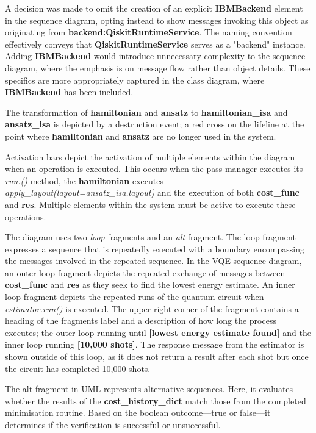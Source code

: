 \documentclass{article}
\begin{document}
{A decision was made to omit the creation of an explicit \textbf{IBMBackend} element in the sequence diagram, opting instead to show messages invoking this object as originating from \textbf{backend:QiskitRuntimeService}.
The naming convention effectively conveys that \textbf{QiskitRuntimeService} serves as a "backend" instance. Adding \textbf{IBMBackend} would introduce unnecessary complexity to the sequence diagram, where the emphasis is on message flow rather than object details. These specifics are more appropriately captured in the class diagram, where \textbf{IBMBackend} has been included.

The transformation of \textbf{hamiltonian} and \textbf{ansatz} to \textbf{hamiltonian\_isa} and \textbf{ansatz\_isa} is depicted by a destruction event; a red cross on the lifeline at the point where \textbf{hamiltonian} and \textbf{ansatz} are no longer used in the system.

Activation bars depict the activation of multiple elements within the diagram when an operation is executed\cite{creatley}. This occurs when the pass manager executes its \textit{run.()} method, the  \textbf{hamiltonian} executes \textit{apply\_layout(layout=ansatz\_isa.layout)} and the execution of both \textbf{cost\_func} and \textbf{res}. Multiple elements within the system must be active to execute these operations.

The diagram uses two \textit{loop} fragments and an \textit{alt} fragment. The loop fragment expresses a sequence that is repeatedly executed\cite{Seidl_Scholz_Huemer_Kappel_Duffy_2014} with a boundary encompassing the messages involved in the repeated sequence. In the VQE sequence diagram, an outer loop fragment depicts the repeated exchange of messages between \textbf{cost\_func} and \textbf{res} as they seek to find the lowest energy estimate. An inner loop fragment depicts the repeated runs of the quantum circuit when \textit{estimator.run()} is executed. The upper right corner of the fragment contains a heading of the fragments label and a description of how long the process executes; the outer loop running until \textbf{[lowest energy estimate found]} and the inner loop running \textbf{[10,000 shots]}. The response message from the estimator is shown outside of this loop, as it does not return a result after each shot but once the circuit has completed 10,000 shots. 

The alt fragment in UML represents alternative sequences\cite{Seidl_Scholz_Huemer_Kappel_Duffy_2014}. Here, it evaluates whether the results of the \textbf{cost\_history\_dict} match those from the completed minimisation routine. Based on the boolean outcome—true or false—it determines if the verification is successful or unsuccessful.

}
\end{document}

